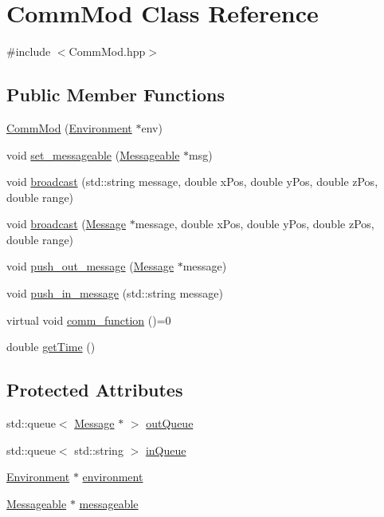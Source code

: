\hypertarget{class_comm_mod}{}\section{Comm\+Mod Class Reference}
\label{class_comm_mod}


{\ttfamily \#include $<$Comm\+Mod.\+hpp$>$}

\subsection*{Public Member Functions}
\begin{DoxyCompactItemize}
\item 
\hyperlink{class_comm_mod_a00ab1077257c3672f8036468aecbf234}{Comm\+Mod} (\hyperlink{class_environment}{Environment} $\ast$env)
\item 
void \hyperlink{class_comm_mod_ab2e096b71516134bc0cb9bae4a965ef7}{set\+\_\+messageable} (\hyperlink{class_messageable}{Messageable} $\ast$msg)
\item 
void \hyperlink{class_comm_mod_abcfe15ea4ed5b27d77d2613cc4e786a3}{broadcast} (std\+::string message, double x\+Pos, double y\+Pos, double z\+Pos, double range)
\item 
void \hyperlink{class_comm_mod_af3e34b66c07a5c1e35a806443d0bca8c}{broadcast} (\hyperlink{class_message}{Message} $\ast$message, double x\+Pos, double y\+Pos, double z\+Pos, double range)
\item 
void \hyperlink{class_comm_mod_a696711acc752f9c2c60865194de3287f}{push\+\_\+out\+\_\+message} (\hyperlink{class_message}{Message} $\ast$message)
\item 
void \hyperlink{class_comm_mod_a2acc6cb30eb7c9d55e3893da147db839}{push\+\_\+in\+\_\+message} (std\+::string message)
\item 
virtual void \hyperlink{class_comm_mod_a48b1d970ce600043bf2b610ae113e825}{comm\+\_\+function} ()=0
\item 
double \hyperlink{class_comm_mod_a7415ee1b2835f8cb0d650df6ed80622a}{get\+Time} ()
\end{DoxyCompactItemize}
\subsection*{Protected Attributes}
\begin{DoxyCompactItemize}
\item 
std\+::queue$<$ \hyperlink{class_message}{Message} $\ast$ $>$ \hyperlink{class_comm_mod_abbd4cbdbb8c4b8680a20aea400e2eabc}{out\+Queue}
\item 
std\+::queue$<$ std\+::string $>$ \hyperlink{class_comm_mod_a4d31d6d1741edaaf0ec840ff8bb30047}{in\+Queue}
\item 
\hyperlink{class_environment}{Environment} $\ast$ \hyperlink{class_comm_mod_ae4953d3dd38bca7f71c309964636af91}{environment}
\item 
\hyperlink{class_messageable}{Messageable} $\ast$ \hyperlink{class_comm_mod_ae45eb57f9d550eb7c0dbb9311a71f72e}{messageable}
\end{DoxyCompactItemize}


